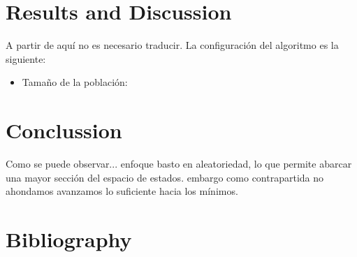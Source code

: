\documentclass{article}
\begin{document}
\section{Results and Discussion}
A partir de aquí no es necesario traducir.
La configuración del algoritmo es la siguiente:
\begin{itemize}
    \item Tamaño de la población: 
\end{itemize}
\section{Conclussion}
    Como se puede observar... enfoque basto en aleatoriedad, lo que permite abarcar una mayor sección del espacio de estados. 
    embargo como contrapartida no ahondamos avanzamos lo suficiente hacia los mínimos. 
\section{Bibliography}
\end{document}
